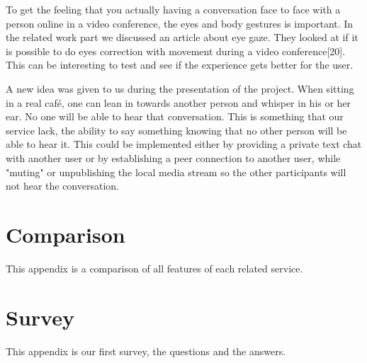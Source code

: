\documentclass[12pt, titlepage]{article}
\begin{document}
To get the feeling that you actually having a conversation face to face with a person online in a video conference, the eyes and body gestures is important. In the related work part we discussed an article about eye gaze. They looked at if it is possible to do eyes correction with movement during a video conference[20]. This can be interesting to test and see if the experience gets better for the user.

A new idea was given to us during the presentation of the project. When sitting in a real café, one can lean in towards another person and whisper in his or her ear. No one will be able to hear that conversation. This is something that our service lack, the ability to say something knowing that no other person will be able to hear it. This could be implemented either by providing a private text chat with another user or by establishing a peer connection to another user, while "muting" or unpublishing the local media stream so the other participants will not hear the conversation.
\newpage
\begin{appendices}
\section{Comparison}
This appendix is a comparison of all features of each related service.

\section{Survey}
This appendix is our first survey, the questions and the answers.


\end{appendices}
\end{document}
